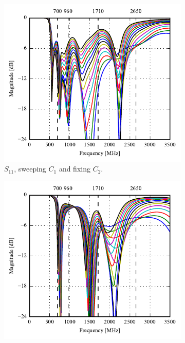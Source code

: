 \begin{figure}[htbp]
   \begin{subfigure}[b]{0.49\linewidth}
        \centering
        \includegraphics{img/tech_sol/trianglefeed/talk_mode/Csh1s11.pdf}
        \caption{$S_{11}$, sweeping $C_1$ and fixing $C_2$.}
    \end{subfigure}
    \hfill
    \begin{subfigure}[b]{0.49\linewidth}
        \centering
        \includegraphics{img/tech_sol/trianglefeed/talk_mode/Csh2s22.pdf}

\end{subfigure}
\end{figure}
